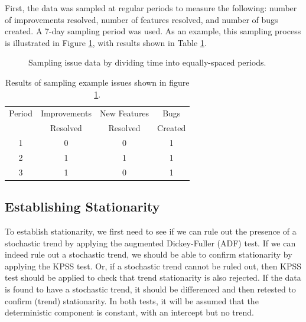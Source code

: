 \documentclass[letterpaper]{report}
\begin{document}
First, the data was sampled at regular periods to measure the following: number of improvements resolved, number of features resolved, and number of bugs created. A 7-day sampling period was used. As an example, this sampling process is illustrated in Figure \ref{fig:sampling_issue_data}, with results shown in Table \ref{tab:sampling_issue_data}.

\begin{figure}[htbp]
\begin{center}
\caption[Sampling issue data]{Sampling issue data by dividing time into equally-spaced periods.}
\label{fig:sampling_issue_data}
\end{center}
\end{figure}

\begin{table}[htbp]
\caption[Sampling issue data]{Results of sampling example issues shown in figure \ref{fig:sampling_issue_data}.}
\centering
\begin{tabular}{ c | c | c | c }
\hline
Period & Improvements & New Features & Bugs \\
~& Resolved & Resolved & Created \\
\hline
1 & 0 & 0 & 1 \\
2 & 1 & 1 & 1 \\
3 & 1 & 0 & 1 \\
\hline
\end{tabular}
\label{tab:sampling_issue_data}
\end{table}

\subsection*{Establishing Stationarity}
To establish stationarity, we first need to see if we can rule out the presence of a stochastic trend by applying the augmented Dickey-Fuller (ADF) test. If we can indeed rule out a stochastic trend, we should be able to confirm stationarity by applying the KPSS test. Or, if a stochastic trend cannot be ruled out, then KPSS test should be applied to check that trend stationarity is also rejected. If the data is found to have a stochastic trend, it should be differenced and then retested to confirm (trend) stationarity. In both tests, it will be assumed that the deterministic component is constant, with an intercept but no trend.
\end{document}
